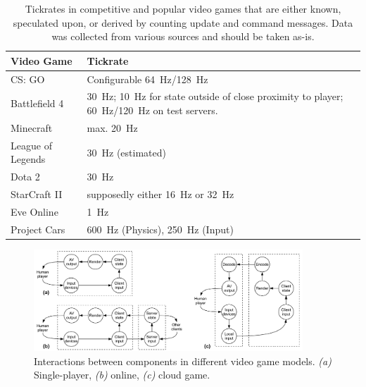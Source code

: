 \begin{table}[!t]
\caption{Tickrates in competitive and popular video games that are either known, speculated upon, or derived by counting update and command messages. Data was collected from various sources and should be taken as-is.}
\label{tbl:tickrates}
	\centering
	\begin{tabu}{X[0.45]X}
		\toprule
		\textbf{Video Game} & \textbf{Tickrate} \\
		\midrule
		CS: GO & Configurable \SI{64}{\hertz}/\SI{128}{\hertz} \\
		Battlefield 4 & \SI{30}{\hertz}; \SI{10}{\hertz} for state outside of close proximity to player; \SI{60}{\hertz}/\SI{120}{\hertz} on test servers. \\
		Minecraft & max. \SI{20}{\hertz} \\
		League of Legends & \SI{30}{\hertz} (estimated) \\
		Dota 2 & \SI{30}{\hertz} \\
		StarCraft II & supposedly either \SI{16}{\hertz} or \SI{32}{\hertz} \\
		Eve Online & \SI{1}{\hertz} \\
		Project Cars & \SI{600}{\hertz} (Physics), \SI{250}{\hertz} (Input) \\ %
		\bottomrule
	\end{tabu}
\end{table}

\begin{figure}[!t]
  \centering
  \includegraphics[width=0.9\textwidth]{../../../models/component_interaction_full.pdf}
  \caption{Interactions between components in different video game models. \textit{(a)} Single-player, \textit{(b)} online, \textit{(c)} cloud game.}
  \label{fig:component-models}
\end{figure}

